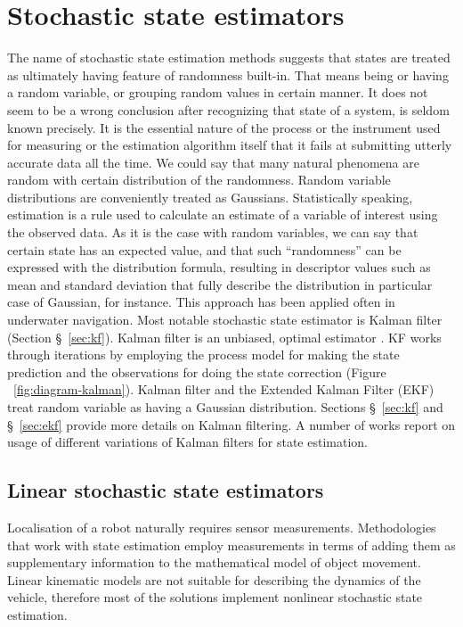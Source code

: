 \section{Stochastic state estimators}
The name of stochastic state estimation methods suggests that states are treated as ultimately having feature of randomness built-in. That means being or having a random variable, or grouping random values in certain manner. It does not seem to be a wrong conclusion after recognizing that state of a system, is seldom known precisely. It is the essential nature of the process or the instrument used for measuring or the estimation algorithm itself that it fails at submitting utterly accurate data all the time. We could say that many natural phenomena are random with certain distribution of the randomness. Random variable distributions are conveniently treated as Gaussians. Statistically speaking, estimation is a rule used to calculate an estimate of a variable of interest using the observed data. As it is the case with random variables, we can say that certain state has an expected value, and that such ``randomness'' can be expressed with the distribution formula, resulting in descriptor values such as mean and standard deviation that fully describe the distribution in particular case of Gaussian, for instance. This approach has been applied often in underwater navigation. Most notable stochastic state estimator is Kalman filter (Section \S~\ref{sec:kf}). Kalman filter is an unbiased, optimal estimator \cite{kalman60, grewal01}. KF works through iterations by employing the process model for making the state prediction and the observations for doing the state correction (Figure ~\ref{fig:diagram-kalman}). Kalman filter and the Extended Kalman Filter (EKF) treat random variable as having a Gaussian distribution. Sections \S~\ref{sec:kf} and \S~\ref{sec:ekf} provide more details on Kalman filtering. A number of works report on usage of different variations of Kalman filters for state estimation. %
\subsection{Linear stochastic state estimators}
Localisation of a robot naturally requires sensor measurements. Methodologies that work with state estimation employ measurements in terms of adding them as supplementary information to the mathematical model of object movement. Linear kinematic models are not suitable for describing the dynamics of the vehicle, therefore most of the solutions implement nonlinear stochastic state estimation.   
